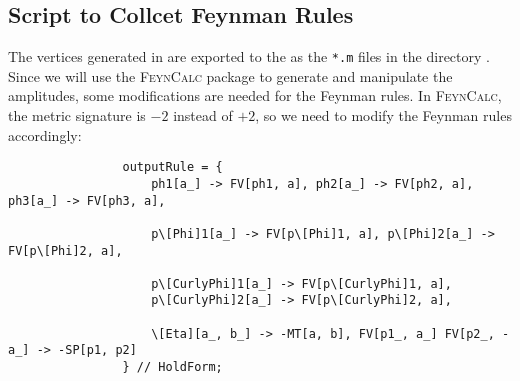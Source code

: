 \documentclass{article}
\begin{document}
        \subsection{Script to Collcet Feynman Rules}

            The vertices generated in  are exported to the as the \texttt{*.m} files in the directory .
            Since we will use the \textsc{FeynCalc} package \cite{Mertig:1990an, Shtabovenko:2016sxi, Shtabovenko:2020gxv, Shtabovenko:2023idz} to generate and manipulate the amplitudes, some modifications are needed for the Feynman rules.
            In \textsc{FeynCalc}, the metric signature is $-2$ instead of $+2$, so we need to modify the Feynman rules accordingly:
            \begin{verbatim}
                outputRule = {
                    ph1[a_] -> FV[ph1, a], ph2[a_] -> FV[ph2, a], ph3[a_] -> FV[ph3, a],
    
                    p\[Phi]1[a_] -> FV[p\[Phi]1, a], p\[Phi]2[a_] -> FV[p\[Phi]2, a],
    
                    p\[CurlyPhi]1[a_] -> FV[p\[CurlyPhi]1, a],
                    p\[CurlyPhi]2[a_] -> FV[p\[CurlyPhi]2, a],
    
                    \[Eta][a_, b_] -> -MT[a, b], FV[p1_, a_] FV[p2_, -a_] -> -SP[p1, p2]
                } // HoldForm;
            \end{verbatim}
\end{document}

